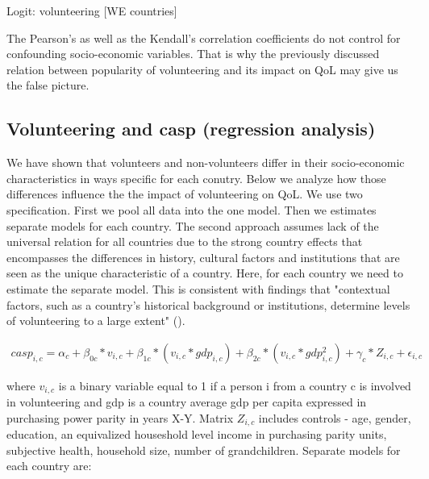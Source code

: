 \documentclass[10pt, letterpaper]{article}
\begin{document}
\begin{spacing}{1.4}
\begin{spacing}{.9}
\begin{table}[H]
\centering 
\caption{Logit: volunteering [WE countries]}  
\begin{small} 
	 
      \label{logitWE} 
\end{small}
\end{table}
\end{spacing}



The Pearson's as well as the Kendall's correlation coefficients do not control for confounding socio-economic variables. That is why the previously discussed relation between popularity of volunteering and its impact on QoL may give us the false picture. 
 
\subsection*{Volunteering and casp (regression analysis)}

We have shown that volunteers and non-volunteers differ in their  socio-economic characteristics in ways specific for each conutry.  Below we analyze how those differences influence the the impact of volunteering on QoL. We use two specification. First we pool all data into the one model. Then we estimates separate models for each country. The second approach assumes lack of the universal relation for all countries due to the strong country effects that  encompasses the differences in history, cultural factors and institutions that are seen as the unique characteristic of a country. Here, for each country we need to estimate the separate model. This is consistent with findings that "contextual factors, such as a country’s historical background or institutions, determine levels of volunteering to a large extent" (\citet{plagnol10}).

  \begin{eqnarray}
	casp_{i,c}= \alpha_{c}+ \beta_{0c}*v_{i,c} + \beta_{1c}*(v_{i,c}*gdp_{i,c})+ \beta_{2c}*(v_{i,c}*gdp_{i,c}^{2}) + \gamma_{c}*Z_{i,c} + \epsilon_{i,c}
 \end{eqnarray}

where $v_{i,c}$ is a binary variable equal to 1 if a person i from a country c is involved in  volunteering  and gdp is a country average gdp per capita expressed in purchasing power parity in years X-Y. Matrix $Z_{i,c}$ includes controls - age, gender, education, an equivalized houseshold level income in purchasing parity units, subjective health, household size, number of grandchildren.
Separate models for each country are:


\end{spacing}
\end{document}
